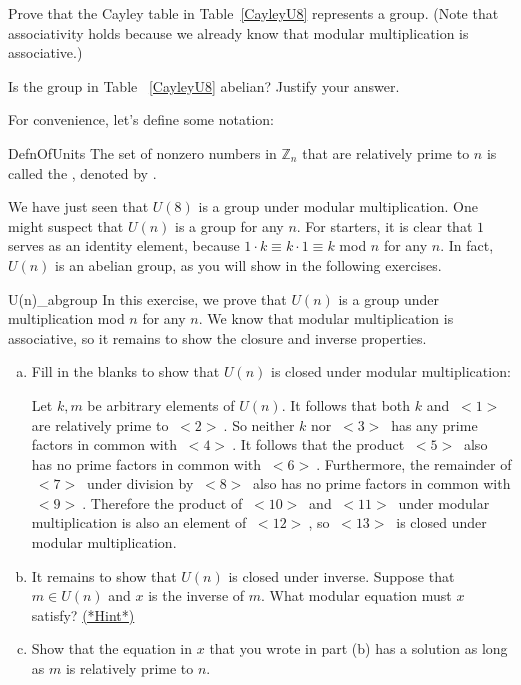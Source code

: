\begin{exercise}{27}
Prove that the Cayley table in Table~\ref{CayleyU8} represents a group. (Note that associativity holds because we already know that modular multiplication is associative.)
\end{exercise}

\begin{exercise}{28}
Is the group in Table ~\ref{CayleyU8} abelian?  Justify your answer.
\end{exercise}
For convenience, let's define some notation:

\begin{defn}{DefnOfUnits}
The set of nonzero numbers in ${\mathbb Z}_n$ that are relatively prime to $n$ is called the , denoted by .
\end{defn}

  We have just seen that  $U(8)$ is a group under modular multiplication.  One might suspect that  $U(n)$ is a group for any $n$.  For starters, it is clear that $1$ serves as an  identity element, because $1\cdot k \equiv k \cdot 1 \equiv  k$ mod $n$ for any $n$. In fact, $U(n)$ is an abelian group, as you will show in the following exercises.

\begin{exercise}{U(n)_abgroup}
In this exercise, we prove that $U(n)$ is a group under multiplication mod $n$ for any $n$. We know that modular multiplication is associative, so it remains to show the closure and inverse properties.  
\begin{enumerate}[(a)]
\item
Fill in the blanks to show that $U(n)$ is closed under modular multiplication:

Let $k,m$ be arbitrary elements of  $U(n)$. It follows that both $k$ and \underline{$~<1>~$} are relatively prime to \underline{$~<2>~$}. So neither $k$ nor \underline{$~<3>~$} has any prime factors in common with \underline{$~<4>~$}. It follows that the product \underline{$~<5>~$} also has no prime factors in common with \underline{$~<6>~$}. Furthermore, the remainder of \underline{$~<7>~$} under division by \underline{$~<8>~$} also has no prime factors in common with \underline{$~<9>~$}. Therefore the product of \underline{$~<10>~$} and \underline{$~<11>~$} under modular multiplication is also an element of \underline{$~<12>~$}, so \underline{$~<13>~$} is closed under modular multiplication.
\item
It remains to show that $U(n)$ is closed under inverse. Suppose that $m \in U(n)$ and $x$ is the inverse of $m$. What modular equation must $x$ satisfy?
\hyperref[sec:Groups:Hints]{(*Hint*)}
\item Show that the equation in $x$ that you wrote in part (b) has a solution as long as $m$ is relatively prime to $n$.
\end{enumerate}
\end{exercise}  

